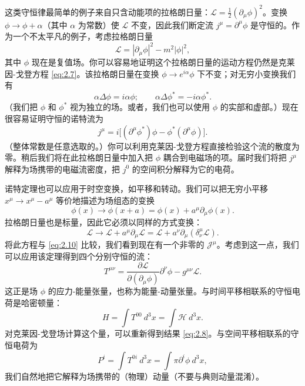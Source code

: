 这类守恒律最简单的例子来自只含动能项的拉格朗日量：$\mathcal{L} = \tfrac{1}{2}(\partial_\mu\phi)^2$。变换 $\phi\to\phi+\alpha$（其中 $\alpha$ 为常数）使 $\mathcal{L}$ 不变，因此我们断定流 $j^\mu = \partial^\mu\phi$ 是守恒的。作为一个不太平凡的例子，考虑拉格朗日量
\begin{equation}
  \mathcal{L} = |\partial_\mu\phi|^2 - m^2|\phi|^2,
  \label{eq:2.14}
\end{equation}
其中 $\phi$ 现在是复值场。你可以容易地证明这个拉格朗日量的运动方程仍然是克莱因-戈登方程 \eqref{eq:2.7}。该拉格朗日量在变换 $\phi \to e^{i\alpha}\phi$ 下不变；对无穷小变换我们有
\begin{equation}
  \alpha\Delta\phi = i\alpha\phi;\qquad
  \alpha\Delta\phi^{*} = -i\alpha\phi^{*}.
  \label{eq:2.15}
\end{equation}
（我们把 $\phi$ 和 $\phi^{*}$ 视为独立的场。或者，我们也可以使用 $\phi$ 的实部和虚部。）现在很容易证明守恒的诺特流为
\begin{equation}
  j^\mu = i\bigl[ (\partial^\mu\phi^{*})\phi - \phi^{*}(\partial^\mu\phi)
    \bigr].
  \label{eq:2.16}
\end{equation}
（整体常数是任意选取的。）你可以利用克莱因-戈登方程直接检验这个流的散度为零。稍后我们将在此拉格朗日量中加入把 $\phi$ 耦合到电磁场的项。届时我们将把 $j^\mu$ 解释为场携带的电磁流密度，把 $j^0$ 的空间积分解释为它的电荷。

诺特定理也可以应用于时空变换，如平移和转动。我们可以把无穷小平移 $x^\mu \to x^\mu - a^\mu$ 等价地描述为场组态的变换
\begin{equation}
  \phi(x) \to \phi(x+a) = \phi(x) + a^\mu\partial_\mu\phi(x).
\end{equation}
拉格朗日量也是标量，因此它必须以同样的方式变换：
\begin{equation}
  \mathcal{L} \to \mathcal{L} + a^\mu\partial_\mu\mathcal{L}
    = \mathcal{L} + a^\nu\partial_\mu(\delta^\mu_\nu\mathcal{L}).
\end{equation}
将此方程与 \eqref{eq:2.10} 比较，我们看到现在有一个非零的 $\mathcal{J}^\mu$。考虑到这一点，我们可以应用该定理得到四个分别守恒的流：
\begin{equation}
  T^{\mu\nu} = \frac{\partial\mathcal{L}}{\partial(\partial_\mu\phi)}
    \partial^\nu\phi - g^{\mu\nu}\mathcal{L} .
  \label{eq:2.17}
\end{equation}
这正是场 $\phi$ 的应力-能量张量，也称为能量-动量张量。与时间平移相联系的守恒电荷是哈密顿量：
\begin{equation}
  H = \int T^{00}\ d^3x = \int \mathcal{H}\ d^3x.
  \label{eq:2.18}
\end{equation}
对克莱因-戈登场计算这个量，可以重新得到结果 \eqref{eq:2.8}。与空间平移相联系的守恒电荷为
\begin{equation}
  P^i = \int T^{0i}\ d^3x = \int \pi\partial^i\phi\ d^3x ,
  \label{eq:2.19}
\end{equation}
我们自然地把它解释为场携带的（物理）动量（不要与典则动量混淆）。

